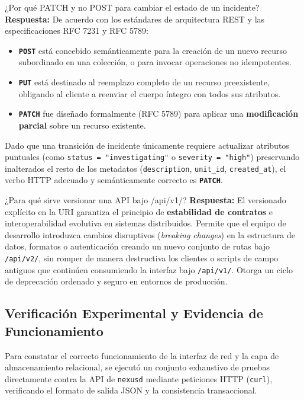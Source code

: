 \documentclass[10pt,a4paper]{article}
\begin{document}
\begin{pregunta}{¿Por qué PATCH y no POST para cambiar el estado de un incidente?}
    \textbf{Respuesta:} De acuerdo con los estándares de arquitectura REST y las especificaciones RFC 7231 y RFC 5789:
    \begin{itemize}[leftmargin=*]
        \item \textbf{\texttt{POST}} está concebido semánticamente para la creación de un nuevo recurso subordinado en una colección, o para invocar operaciones no idempotentes.
        \item \textbf{\texttt{PUT}} está destinado al reemplazo completo de un recurso preexistente, obligando al cliente a reenviar el cuerpo íntegro con todos sus atributos.
        \item \textbf{\texttt{PATCH}} fue diseñado formalmente (RFC 5789) para aplicar una \textbf{modificación parcial} sobre un recurso existente.
    \end{itemize}
    Dado que una transición de incidente únicamente requiere actualizar atributos puntuales (como \texttt{status = "investigating"} o \texttt{severity = "high"}) preservando inalterados el resto de los metadatos (\texttt{description}, \texttt{unit\_id}, \texttt{created\_at}), el verbo HTTP adecuado y semánticamente correcto es \textbf{\texttt{PATCH}}.
\end{pregunta}

\begin{pregunta}{¿Para qué sirve versionar una API bajo /api/v1/?}
    \textbf{Respuesta:} El versionado explícito en la URI garantiza el principio de \textbf{estabilidad de contratos} e interoperabilidad evolutiva en sistemas distribuidos. Permite que el equipo de desarrollo introduzca cambios disruptivos (\textit{breaking changes}) en la estructura de datos, formatos o autenticación creando un nuevo conjunto de rutas bajo \texttt{/api/v2/}, sin romper de manera destructiva los clientes o scripts de campo antiguos que continúen consumiendo la interfaz bajo \texttt{/api/v1/}. Otorga un ciclo de deprecación ordenado y seguro en entornos de producción.
\end{pregunta}

\subsection{Verificación Experimental y Evidencia de Funcionamiento}

Para constatar el correcto funcionamiento de la interfaz de red y la capa de almacenamiento relacional, se ejecutó un conjunto exhaustivo de pruebas directamente contra la API de \texttt{nexusd} mediante peticiones HTTP (\texttt{curl}), verificando el formato de salida JSON y la consistencia transaccional.
\end{document}
